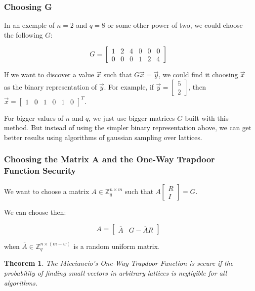 \documentclass[a4paper]{article}
\newtheorem{theorem}{Theorem}
\begin{document}
 \subsubsection{Choosing G}
 
 In an exemple of $n=2$ and $q=8$ or some other power of two, we could choose the following $G$:
 
 $$
 G = \begin{bmatrix}1 & 2 & 4 & 0 & 0 & 0\\0 & 0 & 0 & 1 & 2& 4\end{bmatrix}
 $$
 
 If we want to discover a value $\overrightarrow{x}$ such that $G\overrightarrow{x}=\overrightarrow{y}$, we could find it choosing $\overrightarrow{x}$ as the binary representation of $\overrightarrow{y}$. For example, if $\overrightarrow{y}=\begin{bmatrix}5\\2\end{bmatrix}$, then $\overrightarrow{x}=\begin{bmatrix}1&0&1&0&1&0\end{bmatrix}^T$.
 
 For bigger values of $n$ and $q$, we just use bigger matrices $G$ built with this method. But instead of using the simpler binary representation above, we can get better results using algorithms of gaussian sampling over lattices.
 
 \subsubsection{Choosing the Matrix A and the One-Way Trapdoor Function Security}

 We want to choose a matrix $A \in \mathbb{Z}_q^{n \times m}$ such that $A\begin{bmatrix}R\\I\end{bmatrix} = G$. 
 
 We can choose then:
 
 $$
 A = \begin{bmatrix}\overline{A} & G-\overline{A}R\end{bmatrix}
 $$
 
 when $\overline{A} \in \mathbb{Z}_q^{n \times (m-w)}$ is a random uniform matrix.
 
 \begin{theorem}
 The Micciancio's One-Way Trapdoor Function is secure if the probability of finding small vectors in arbitrary lattices is negligible for all algorithms.
 \end{theorem}
 
\end{document}
